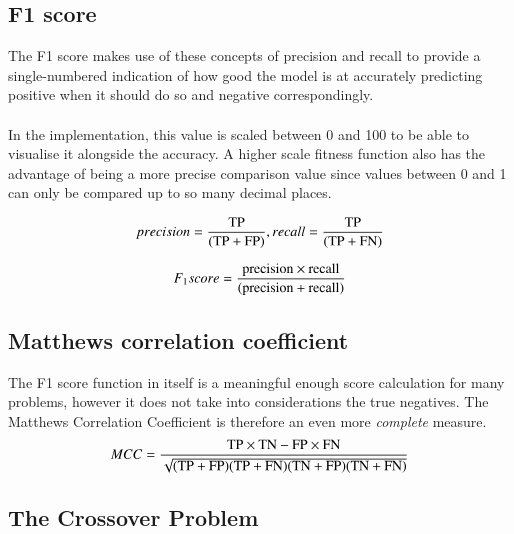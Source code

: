 \documentclass[a4paper,12pt, oneside]{memoir}
\begin{document}
\subsection{F1 score}
The F1 score makes use of these concepts of precision and recall to provide a single-numbered indication of how good the model is at accurately predicting positive when it should do so and negative correspondingly. 
\\ \\
In the implementation, this value is scaled between 0 and 100 to be able to visualise it alongside the accuracy. A higher scale fitness function also has the advantage of being a more precise comparison value since values between 0 and 1 can only be compared up to so many decimal places.

\begin{equation}
precision = { \text{TP} \over (\text{TP}  + \text{FP} )} , recall = { \text{TP} \over (\text{TP}  +  \text{FN} )}
\end{equation}

\begin{equation}
F_{1} score = { \text{precision} \times \text{recall} \over (\text{precision}  +  \text{recall} )}
\end{equation}

\subsection{Matthews correlation coefficient}
The F1 score function in itself is a meaningful enough score calculation for many problems, however it does not take into considerations the true negatives. The Matthews Correlation Coefficient is therefore an even more \textit{complete} measure. 
\begin{equation}
MCC = { \text{TP} \times \text{TN} - \text{FP} \times \text{FN} \over \sqrt{ (\text{TP} + \text{FP}) (\text{TP} + \text{FN}) (\text{TN} + \text{FP}) (\text{TN} + \text{FN})  } }
\end{equation}


\subsection{The Crossover Problem}
\end{document}
